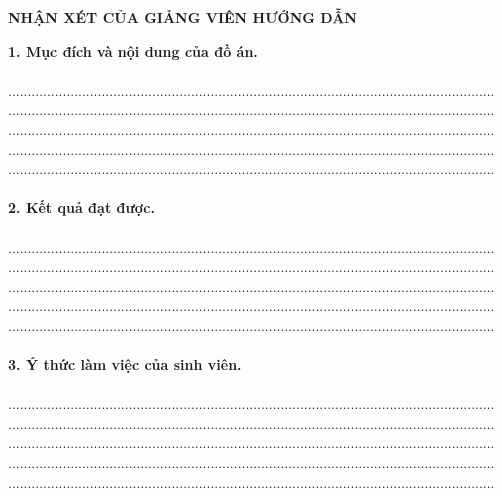 \documentclass[12pt,a4paper]{report}
\begin{document}
	\newpage
	\thispagestyle{empty}
	\begin{center}
		\fontsize{14}{16}	
		\textbf{NHẬN XÉT CỦA GIẢNG VIÊN HƯỚNG DẪN}
		\vspace*{0.7cm}
	\end{center}
	\textbf{1. Mục đích và nội dung của đồ án.}\\\\
	.............................................................................................................................\\.............................................................................................................................\\.............................................................................................................................\\.............................................................................................................................\\.............................................................................................................................\\\\
	\textbf{2. Kết quả đạt được.}\\\\
	.............................................................................................................................\\.............................................................................................................................\\.............................................................................................................................\\.............................................................................................................................\\.............................................................................................................................\\\\
	\textbf{3. Ý thức làm việc của sinh viên.}\\\\
	.............................................................................................................................\\.............................................................................................................................\\.............................................................................................................................\\.............................................................................................................................\\.............................................................................................................................\\\\
	
\end{document}

